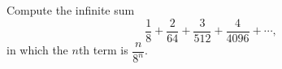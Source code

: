 Compute the infinite sum
\[\dfrac{1}{8}+\dfrac{2}{64}+\dfrac{3}{512}+\dfrac{4}{4096}+\cdots,\]
in which the $n$th term is $\dfrac{n}{8^n}$.
